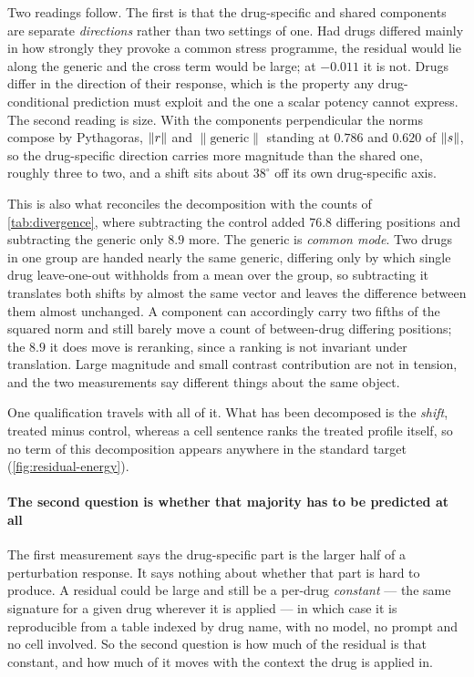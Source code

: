 Two readings follow. The first is that the drug-specific and shared components are
separate \emph{directions} rather than two settings of one. Had drugs differed
mainly in how strongly they provoke a common stress programme, the residual would
lie along the generic and the cross term would be large; at $-0.011$ it is not.
Drugs differ in the direction of their response, which is the property any
drug-conditional prediction must exploit and the one a scalar potency cannot
express. The second reading is size. With the components perpendicular the norms
compose by Pythagoras, $\lVert r \rVert$ and $\lVert \textrm{generic} \rVert$
standing at $0.786$ and $0.620$ of $\lVert s \rVert$, so the drug-specific
direction carries more magnitude than the shared one, roughly three to two, and a
shift sits about $38^{\circ}$ off its own drug-specific axis.

This is also what reconciles the decomposition with the counts of
\cref{tab:divergence}, where subtracting the control added $76.8$ differing
positions and subtracting the generic only $8.9$ more. The generic is
\emph{common mode}. Two drugs in one group are handed nearly the same generic,
differing only by which single drug leave-one-out withholds from a mean over the
group, so subtracting it translates both shifts by almost the same vector and
leaves the difference between them almost unchanged. A component can accordingly
carry two fifths of the squared norm and still barely move a count of between-drug
differing positions; the $8.9$ it does move is reranking, since a ranking is not
invariant under translation. Large magnitude and small contrast contribution are
not in tension, and the two measurements say different things about the same
object.

One qualification travels with all of it. What has been decomposed is the
\emph{shift}, treated minus control, whereas a cell sentence ranks the treated
profile itself, so no term of this decomposition appears anywhere in the standard
target (\cref{fig:residual-energy}).




\paragraph{The second question is whether that majority has to be predicted at all}
The first measurement says the drug-specific part is the larger half of a
perturbation response. It says nothing about whether that part is hard to produce.
A residual could be large and still be a per-drug \emph{constant} --- the same
signature for a given drug wherever it is applied --- in which case it is
reproducible from a table indexed by drug name, with no model, no prompt and no
cell involved. So the second question is how much of the residual is that
constant, and how much of it moves with the context the drug is applied in.

